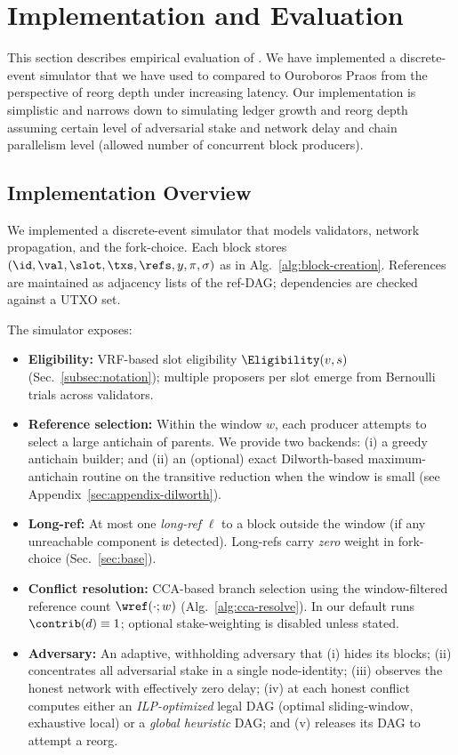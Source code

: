 


\section{Implementation and Evaluation}
\label{sec:impl-eval}

This section describes empirical evaluation of \ProjBase. We have implemented a discrete-event simulator that we have used to compared \ProjBase to Ouroboros Praos from the perspective of reorg depth under increasing latency. Our implementation is simplistic and narrows down to simulating ledger growth and reorg depth assuming certain level of adversarial stake and network delay and chain parallelism level (allowed number of concurrent block producers).

\subsection{Implementation Overview}
We implemented a discrete-event simulator that models validators, network propagation, and the \ProjBase{} fork-choice. Each block stores \linebreak
$(\id,\val,\slot,\txs,\refs,y,\pi,\sigma)$ as in Alg.~\ref{alg:block-creation}. References are maintained as adjacency lists of the ref-DAG; dependencies are checked against a UTXO set.

The simulator exposes:
\begin{itemize}
	\item \textbf{Eligibility:} VRF-based slot eligibility $\Eligibility(v,s)$ (Sec.~\ref{subsec:notation}); multiple proposers per slot emerge from Bernoulli trials across validators.
	\item \textbf{Reference selection:} Within the window $w$, each producer attempts to select a large antichain of parents. We provide two backends: (i) a greedy antichain builder; and (ii) an (optional) exact Dilworth-based maximum-antichain routine on the transitive reduction when the window is small (see Appendix~\ref{sec:appendix-dilworth}).
	\item \textbf{Long-ref:} At most one \emph{long-ref} $\ell$ to a block outside the window (if any unreachable component is detected). Long-refs carry \emph{zero} weight in fork-choice (Sec.~\ref{sec:base}).
	\item \textbf{Conflict resolution:} CCA-based branch selection using the window-filtered reference count $\wref(\cdot;w)$ (Alg.~\ref{alg:cca-resolve}). In our default runs $\contrib(d)\equiv 1$; optional stake-weighting is disabled unless stated.
	\item \textbf{Adversary:} An adaptive, withholding adversary that (i) hides its blocks; (ii) concentrates all adversarial stake in a single node-identity; (iii) observes the honest network with effectively zero delay; (iv) at each honest conflict computes either an \emph{ILP-optimized} legal DAG (optimal sliding-window, exhaustive local) or a \emph{global heuristic} DAG; and (v) releases its DAG to attempt a reorg.
\end{itemize}

